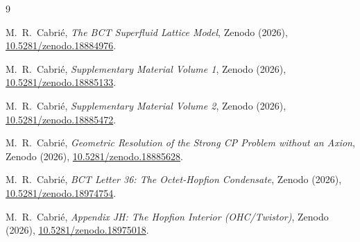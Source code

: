 \documentclass[aps,prl,twocolumn,showpacs,preprintnumbers]{revtex4-2}
\begin{document}
\begin{thebibliography}{9}

M.~R.\ Cabri\'e,
\textit{The BCT Superfluid Lattice Model},
Zenodo (2026),
\href{https://doi.org/10.5281/zenodo.18884976}{10.5281/zenodo.18884976}.

M.~R.\ Cabri\'e,
\textit{Supplementary Material Volume 1},
Zenodo (2026),
\href{https://doi.org/10.5281/zenodo.18885133}{10.5281/zenodo.18885133}.

M.~R.\ Cabri\'e,
\textit{Supplementary Material Volume 2},
Zenodo (2026),
\href{https://doi.org/10.5281/zenodo.18885472}{10.5281/zenodo.18885472}.

M.~R.\ Cabri\'e,
\textit{Geometric Resolution of the Strong CP Problem without an Axion},
Zenodo (2026),
\href{https://doi.org/10.5281/zenodo.18885628}{10.5281/zenodo.18885628}.

M.~R.\ Cabri\'e,
\textit{BCT Letter 36: The Octet-Hopfion Condensate},
Zenodo (2026),
\href{https://doi.org/10.5281/zenodo.18974754}{10.5281/zenodo.18974754}.

M.~R.\ Cabri\'e,
\textit{Appendix JH: The Hopfion Interior (OHC/Twistor)},
Zenodo (2026),
\href{https://doi.org/10.5281/zenodo.18975018}{10.5281/zenodo.18975018}.

\end{thebibliography}
\end{document}
